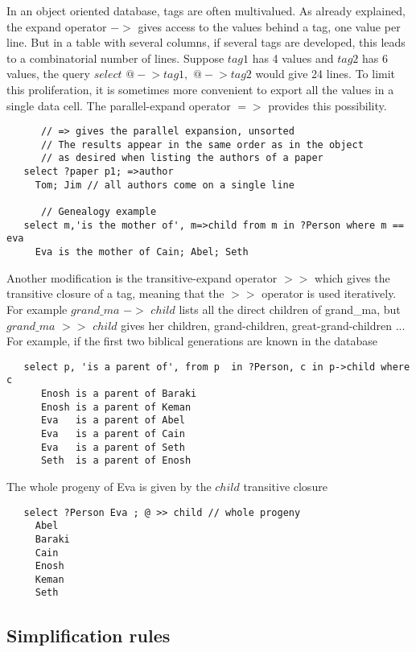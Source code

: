 \documentclass[11pt]{article}
\newcommand{\BL}{\begin{lstlisting}}
\begin{document}
In an object oriented database, tags are often multivalued.
As already explained, the expand operator $->$ gives access to
the values behind a tag, one value per line. But in a table with several
columns, if several tags are developed, this leads to
a combinatorial number of lines. Suppose $tag1$ has 4 values and $tag2$ 
has 6 values,
the query $select$ $@-$$>tag1,$ $@-$$>tag2$ would give 24 lines.
To limit this proliferation, it is sometimes more convenient
to export all the values in a single data cell. The
parallel-expand operator $=>$ provides this possibility.
\BL
      // => gives the parallel expansion, unsorted
      // The results appear in the same order as in the object
      // as desired when listing the authors of a paper
   select ?paper p1; =>author
     Tom; Jim // all authors come on a single line

      // Genealogy example
   select m,'is the mother of', m=>child from m in ?Person where m == eva 
     Eva is the mother of Cain; Abel; Seth
\end{lstlisting}

Another modification is the transitive-expand operator $>>$
which gives the transitive closure of a tag, meaning that 
the $>>$ operator is used iteratively. 
For example $grand\_ma$ $->$ $child$ 
lists all the direct children of grand\_ma, 
but $grand\_ma$ $>>$ $child$ gives 
her children, grand-children, great-grand-children ... 
For example, if the first two biblical generations
are known in the database
\BL
   select p, 'is a parent of', from p  in ?Person, c in p->child where c
      Enosh	is a parent of Baraki
      Enosh	is a parent of Keman
      Eva	is a parent of Abel
      Eva	is a parent of Cain
      Eva	is a parent of Seth
      Seth	is a parent of Enosh
\end{lstlisting}
The whole progeny of Eva is given by the $child$ transitive closure
\BL
   select ?Person Eva ; @ >> child // whole progeny
     Abel
     Baraki
     Cain
     Enosh
     Keman
     Seth
\end{lstlisting}

\subsection{Simplification rules}
\end{document}
